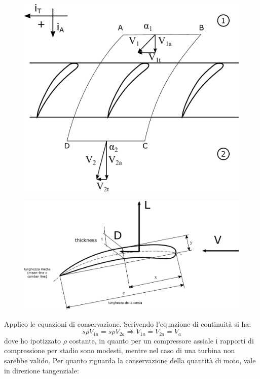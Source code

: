 \begin{figure}
\centering
\begin{minipage}{.4\textwidth}
  \centering
  \includegraphics[width=.95\linewidth]{fig/schiera1.pdf}
  \label{fig:schiera1}
\end{minipage}%
\begin{minipage}{.6\textwidth}
  \centering
  \includegraphics[width=.85\linewidth]{fig/LDref.pdf}
  \label{fig:LDref}
\end{minipage}
\end{figure}
Applico le equazioni di conservazione. Scrivendo l'equazione di continuità si ha:
\begin{equation}
s \rho V_{1a} = s \rho V_{2a} \Rightarrow V_{1a} = V_{2a} = V_a
\end{equation}
dove ho ipotizzato $\rho$ costante, in quanto per un compressore assiale i rapporti di compressione per stadio sono modesti, mentre nel caso di una turbina non sarebbe valido. Per quanto riguarda la conservazione della quantità di moto, vale in direzione tangenziale:
